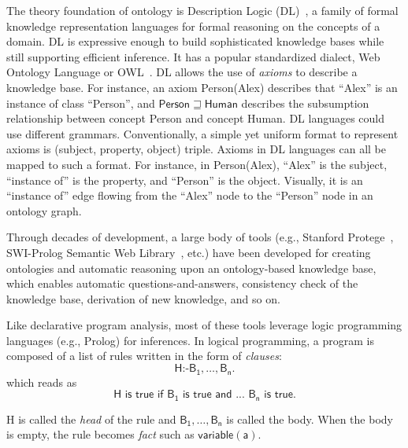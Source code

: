 The theory foundation of ontology is Description Logic (DL)~\cite{krotzsch2012description}, a family of formal knowledge representation languages for formal reasoning on the concepts of a domain. 
DL is expressive enough to build sophisticated knowledge bases while still supporting efficient inference.
It has a popular standardized dialect, Web Ontology
Language or OWL~\cite{mcguinness2004owl}. 
DL allows the use of {\em axioms} to describe a knowledge
base. For instance, an axiom \textsf{Person(Alex)} describes that
``Alex'' is an instance of class ``Person'',
and $\mathsf{Person}\sqsupseteq \mathsf{Human}$ describes the
subsumption relationship between concept \textsf{Person} and concept
\textsf{Human}. DL languages could use different
grammars. Conventionally, a simple yet uniform format to represent axioms is \textsf{(subject, property, object)} triple. Axioms in DL
languages can all be mapped to such a format. For instance, in
\textsf{Person(Alex)}, ``Alex'' is the subject, ``instance of'' is the
property, and ``Person'' is the object. Visually, it is an ``instance
of'' edge flowing from the ``Alex'' node to the ``Person'' node in an
ontology graph.

Through decades of development, a large body of tools 
(e.g., Stanford Protege~\cite{gennari2003evolution}, SWI-Prolog Semantic Web Library~\cite{wielemaker2011}, etc.)
have been developed for creating ontologies and automatic reasoning upon an ontology-based
knowledge base, which enables automatic questions-and-answers,
consistency check of the knowledge base, derivation of new knowledge,
and so on.

Like declarative program analysis, most of these tools leverage logic
programming languages (e.g., Prolog) for inferences. In logical
programming, a program is composed of a list of rules written in the
form of \emph{clauses}:
\[
\mathsf{H \mbox{:-}  B_1, \dots, B_n.}
\]
which reads as 
\[
\textsf{H is true if } \mathsf{B_1} \textsf{ is true and ... } \mathsf{B_n} \textsf{ is true.}
\]

H is called the \emph{head} of the rule and $\mathsf{B_1, \dots, B_n}$
is called the body. When the body is empty, the rule
becomes \emph{fact} such as $\mathsf{variable(a)}$. 






